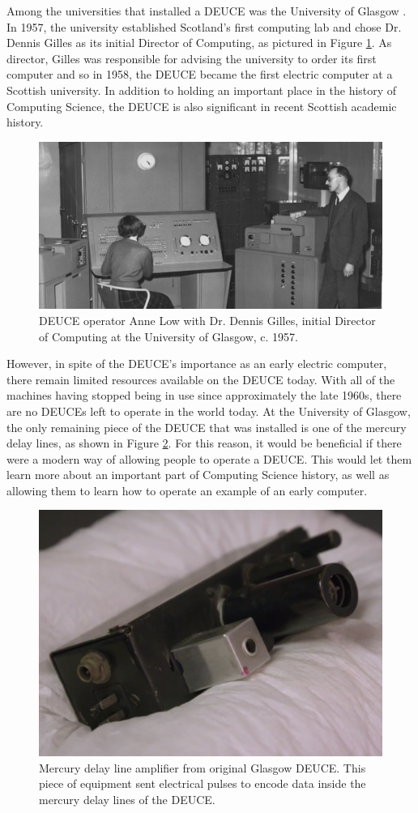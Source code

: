 \documentclass{l4proj}
\begin{document}
Among the universities that installed a DEUCE was the University of Glasgow \citep{Glasgow60}. In 1957, the university established Scotland's first computing lab and chose Dr. Dennis Gilles as its initial Director of Computing, as pictured in Figure \ref{fig:gilles}. As director, Gilles was responsible for advising the university to order its first computer and so in 1958, the DEUCE became the first electric computer at a Scottish university. In addition to holding an important place in the history of Computing Science, the DEUCE is also significant in recent Scottish academic history.

\begin{figure}[b]
	\centering
	\includegraphics[width=0.7\linewidth]{images/gilles}
	\caption{DEUCE operator Anne Low with Dr. Dennis Gilles, initial Director of Computing at the University of Glasgow, c. 1957. \citep{DelayLine19}}
	\label{fig:gilles}
\end{figure}

However, in spite of the DEUCE's importance as an early electric computer, there remain limited resources available on the DEUCE today. With all of the machines having stopped being in use since approximately the late 1960s, there are no DEUCEs left to operate in the world today. At the University of Glasgow, the only remaining piece of the DEUCE that was installed is one of the mercury delay lines, as shown in Figure \ref{fig:amp}. For this reason, it would be beneficial if there were a modern way of allowing people to operate a DEUCE. This would let them learn more about an important part of Computing Science history, as well as allowing them to learn how to operate an example of an early computer.

\begin{figure}[h!]
	\centering
	\includegraphics[width=0.7\linewidth]{images/delay-line-amplifier}
	\caption{Mercury delay line amplifier from original Glasgow DEUCE. This piece of equipment sent electrical pulses to encode data inside the mercury delay lines of the DEUCE. \citep{DelayLine19}}
	\label{fig:amp}
\end{figure}
\end{document}
